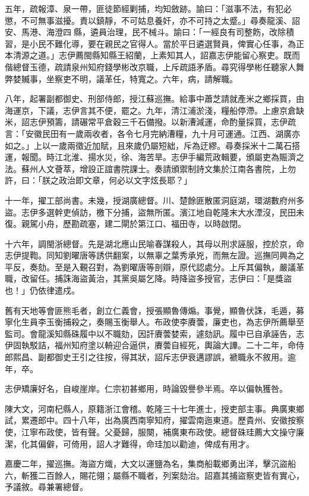\begin{pinyinscope}
五年，疏報漳、泉一帶，匪徒節經剿捕，均知斂跡。諭曰：「滋事不法，有犯必懲，不可無事滋擾。責以鎮靜，不可姑息養奸，亦不可持之太蹙。」尋奏龍溪、詔安、馬港、海澄四縣，遴員治理，民不械斗。諭曰：「一經良有司整飭，改除積習，是小民不難化導，要在親民之官得人。當於平日遴選賢員，俾實心任事，為正本清源之道。」志伊薦閩縣知縣王紹蘭，上素知其人，詔嘉志伊能留心察吏。既而偕總督玉德，疏請泉州知府錢學彬改京職，上斥疏語矛盾。尋究得學彬任聽家人舞弊婪贓事，坐察吏不明，議革任，特寬之。六年，病，請解職。

八年，起署副都御史、刑部侍郎，授江蘇巡撫。給事中蕭芝請就產米之鄉採買，由海運京，下議，志伊言其不便，罷之。九年，清江浦淤淺，糧船停滯。上慮京倉缺米，詔志伊預籌，請碾常平倉穀三千石備撥。以新漕減運，命酌量採買，志伊疏言：「安徽民田有一歲兩收者，各令七月完納漕糧，九十月可運通。江西、湖廣亦如之。」上以一歲兩徵近加賦，且來歲仍屬短絀，斥為迂繆。尋奏採米十二萬石搭運，報聞。時江北淮、揚水災，徐、海苦旱。志伊手編荒政輯要，頒屬吏為賑濟之法。蘇州人文薈萃，增設正誼書院課士。奏請頒禦制詩文集於江南各書院，上勿許，曰：「朕之政治即文章，何必以文字炫長耶？」

十一年，擢工部尚書。未幾，授湖廣總督。川、楚餘匪散匿洞庭湖，環湖數府州多盜。志伊多選幹吏偵訪，檄下分捕，盜無所匿。濱江地自乾隆末大水湮沒，民田未復。親駕小舟，歷勘疏塞，建二閘於第江口、福田寺，以時啟閉。

十六年，調閩浙總督。先是湖北應山民喻春謀殺人，其母以刑求誣服，控於京，命志伊提鞫。同知劉曜唐等誘供翻案，以無辜之葉秀承兇，而無左證。巡撫同興為之平反，奏劾。至是入覲召對，為劉曜唐等剖辯，原代認處分。上斥其偏執，嚴議革職，改留任。捕誅海盜黃治，其黨吳屬乞降。時降盜多授官，志伊曰：「是獎盜也！」仍依律遣戍。

舊有天地等會匪熊毛者，創立仁義會，授張顯魯傳煽。事覺，顯魯伏誅，毛遁，募寧化生員李玉衡捕殺之，奏賜玉衡舉人。布政使李賡蕓，廉吏也，為志伊所薦舉至監司。會龍溪知縣硃履中以不職劾，因訐賡蕓婪索，遽劾訊。履中已自承誣告，志伊固執駁詰，福州知府塗以輈迎合逼供，賡蕓自經死，輿論大譁。二十二年，命侍郎熙昌、副都御史王引之往按，得其狀，詔斥志伊衰邁謬誤，褫職永不敘用。逾年，卒。

志伊矯廉好名，自峻崖岸。仁宗初甚鄉用，時論毀譽參半焉。卒以偏執獲咎。

陳大文，河南杞縣人，原籍浙江會稽。乾隆三十七年進士，授吏部主事。典廣東鄉試，累遷郎中。四十八年，出為廣西南寧知府，擢雲南迤東道。歷貴州、安徽按察使，江寧布政使，皆有聲。父憂歸，服闋，補廣東布政使。總督硃珪薦大文操守廉潔，化其偏僻，可倚用，詔人才難得，命珪加以勸迪，俾成有用才。

嘉慶二年，擢巡撫。海盜方熾，大文以運鹽為名，集商船載鄉勇出洋，擊沉盜船六，斬獲二百餘人，賜花翎；屬縣不職者，列案劾治。詔嘉其捕盜察吏皆有實心，予議敘。尋兼署總督。


\end{pinyinscope}
